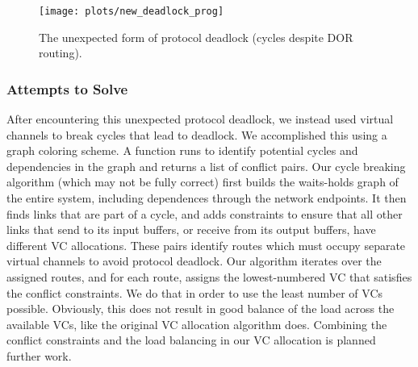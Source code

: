 \begin{figure}
  \centering
  \texttt{[image: plots/new\_deadlock\_prog]}
  \caption{The unexpected form of protocol deadlock (cycles despite DOR routing).}
  \label{net:deadlock}
\end{figure}

\subsubsection{Attempts to Solve}
After encountering this unexpected protocol deadlock, we instead used virtual channels to break cycles that lead to deadlock. We accomplished this using a graph coloring scheme. A function runs to identify potential cycles and dependencies in the graph and returns a list of conflict pairs. 
Our cycle breaking algorithm (which may not be fully correct) first builds the waits-holds graph of the entire system, including dependences through the network endpoints. It then finds links that are part of a cycle, and adds constraints to ensure that all other links that send to its input buffers, or receive from its output buffers, have different VC allocations.
These pairs identify routes which must occupy separate virtual channels to avoid protocol deadlock. Our algorithm iterates over the assigned routes, and for each route, assigns the lowest-numbered VC that satisfies the conflict constraints. We do that in order to use the least number of VCs possible. Obviously, this does not result in good balance of the load across the available VCs, like the original VC allocation algorithm does. Combining the conflict constraints and the load balancing in our VC allocation is planned further work.
